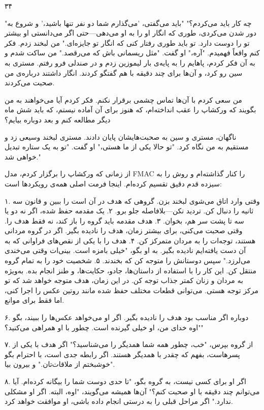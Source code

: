 ۳۴

"چه کار باید می‌کردم؟"
"باید می‌گفتی، 'می‌گذارم شما دو نفر تنها باشید،' و شروع به دور شدن می‌کردی، طوری که انگار او را به او می‌دهی—حتی اگر می‌دانستی او بیشتر تو را دوست دارد. تو باید طوری رفتار کنی که انگار تو جایزه‌ای."
من لبخند زدم. فکر کنم واقعاً فهمیدم.
"آره،" او گفت. "مثل ریسمانی باش که می‌رقصد."
من ساکت شدم و به آن فکر کردم، پاهایم را به پایه‌ی بار لیموزین زدم و در صندلی فرو رفتم. مستری به سین رو کرد، و آن‌ها برای چند دقیقه با هم گفتگو کردند. انگار داشتند درباره‌ی من صحبت می‌کردند.

من سعی کردم با آن‌ها تماس چشمی برقرار نکنم. فکر کردم آیا می‌خواهند به من بگویند که ورکشاپ را عقب انداخته‌ام، که هنوز برای آن آماده نیستم، که باید شش ماه دیگر مطالعه کنم و بعد دوباره بیایم؟

ناگهان، مستری و سین به صحبت‌هایشان پایان دادند. مستری لبخند وسیعی زد و مستقیم به من نگاه کرد.
"تو حالا یکی از ما هستی،" او گفت. "تو به یک ستاره تبدیل خواهی شد."

از زمانی که ورکشاپ را برگزار کردم، مدل FMAC را کنار گذاشته‌ام و روش را به سیزده قدم دقیق تقسیم کرده‌ام. اینجا فرمت اصلی همه‌ی رویکردها است:

۱. وقتی وارد اتاق می‌شوی لبخند بزن. گروهی که هدف در آن است را ببین و قانون سه ثانیه را دنبال کن. تردید نکن—بلافاصله جلو برو.
۲. یک مقدمه حفظ شده، اگر نه دو یا سه تا پشت سر هم، بخوان.
۳. هدف مقدمه باید گروه را باز کند، نه فقط هدف را. وقتی صحبت می‌کنی، برای بیشتر زمان، هدف را نادیده بگیر. اگر در گروه مردانی هستند، توجه‌ات را به مردان متمرکز کن.
۴. هدف را با یکی از نقص‌های فراوانی که به آن دست یافته‌ایم نادیده بگیر. به او بگو، "خیلی بامزه است. بینی‌ات وقتی می‌خندی می‌لرزد." سپس دوستانش را متوجه کن که بخندند.
۵. شخصیت خود را به تمام گروه منتقل کن. این کار را با استفاده از داستان‌ها، جادو، حکایت‌ها، و طنز انجام بده. به‌ویژه به مردان و زنان کمتر جذاب توجه کن. در این زمان، هدف متوجه خواهد شد که تو مرکز توجه هستی. می‌توانی قطعات مختلف حفظ شده مانند روتین عکس را اجرا کنی، اما فقط برای موانع.

۶. دوباره اگر مناسب بود هدف را نادیده بگیر. اگر او می‌خواهد عکس‌ها را ببیند، بگو "اوه خدای من، او خیلی گیرنده است. چطور با او همراهی می‌کنید؟"

۷. از گروه بپرس، "خب، چطور همه شما همدیگر را می‌شناسید؟" اگر هدف با یکی از پسرهاست، بفهم که چقدر با همدیگر هستند. اگر رابطه جدی است، با احترام بگو "خوشبختم از ملاقات‌تان." و بیرون بیا.

۸. اگر او برای کسی نیست، به گروه بگو، "تا حدی دوست شما را بیگانه کرده‌ام. آیا می‌توانم چند دقیقه با او صحبت کنم؟" آن‌ها همیشه می‌گویند، "اوه، البته. اگر او مشکلی ندارد." اگر مراحل قبلی را به درستی انجام داده باشی، او موافقت خواهد کرد.

